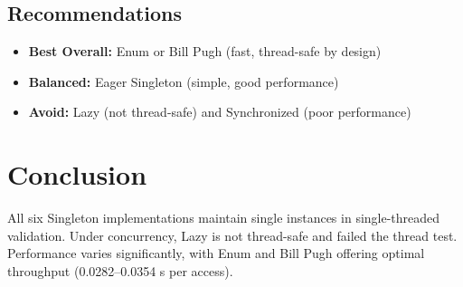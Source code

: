 \documentclass[12pt,a4paper]{article}
\begin{document}
\subsection{Recommendations}

\begin{itemize}
    \item \textbf{Best Overall:} Enum or Bill Pugh (fast, thread-safe by design)
    \item \textbf{Balanced:} Eager Singleton (simple, good performance)
    \item \textbf{Avoid:} Lazy (not thread-safe) and Synchronized (poor performance)
\end{itemize}

\section{Conclusion}

All six Singleton implementations maintain single instances in single-threaded validation. Under concurrency, Lazy is not thread-safe and failed the thread test. Performance varies significantly, with Enum and Bill Pugh offering optimal throughput (0.0282--0.0354 \textmu s per access).
\end{document}
